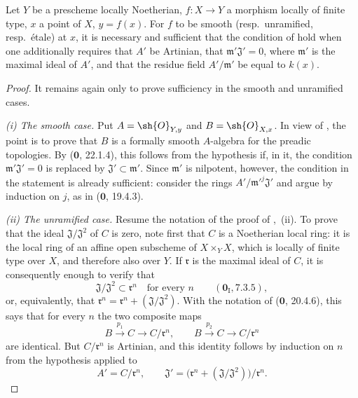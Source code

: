\begin{proposition}[17.14.2]
\label{IV.17.14.2}
Let $Y$ be a prescheme locally Noetherian, $f:X\to Y$ a morphism locally of finite type, $x$ a point of $X$, $y=f(x)$.
For $f$ to be smooth (resp.\ unramified, resp.\ \'etale) at $x$, it is necessary and sufficient that the condition of  hold when one additionally requires that $A'$ be Artinian, that $\mathfrak m'\mathfrak J'=0$, where $\mathfrak m'$ is the maximal ideal of $A'$, and that the residue field $A'/\mathfrak m'$ be equal to $k(x)$.
\end{proposition}


\begin{proof}
It remains again only to prove sufficiency in the smooth and unramified cases.

\emph{(i) The smooth case.}
Put $A=\sh{O}_{Y,y}$ and $B=\sh{O}_{X,x}$.  In view of , the point is to prove that $B$ is a formally smooth $A$-algebra for the preadic topologies.  By ($\mathbf{0}$, 22.1.4), this follows from the hypothesis if, in it, the condition $\mathfrak m'\mathfrak J'=0$ is replaced by $\mathfrak J'\subset\mathfrak m'$.  Since $\mathfrak m'$ is nilpotent, however, the condition in the statement is already sufficient: consider the rings $A'/\mathfrak m'^j\mathfrak J'$ and argue by induction on $j$, as in ($\mathbf{0}$, 19.4.3).

\emph{(ii) The unramified case.}
Resume the notation of the proof of ,~(ii).  To prove that the ideal $\mathfrak J/\mathfrak J^2$ of $C$ is zero, note first that $C$ is a Noetherian local ring: it is the local ring of an affine open subscheme of $X\times_YX$, which is locally of finite type over $X$, and therefore also over $Y$.  If $\mathfrak r$ is the maximal ideal of $C$, it is consequently enough to verify that
\[
 \mathfrak J/\mathfrak J^2\subset\mathfrak r^n
 \quad\text{for every }n
 \qquad(\mathbf{0}_{\mathrm I}, 7.3.5),
\]
or, equivalently, that $\mathfrak r^n=\mathfrak r^n+(\mathfrak J/\mathfrak J^2)$.  With the notation of ($\mathbf{0}$, 20.4.6), this says that for every $n$ the two composite maps
\[
 B\xrightarrow{p_1}C\longrightarrow C/\mathfrak r^n,
 \qquad
 B\xrightarrow{p_2}C\longrightarrow C/\mathfrak r^n
\]
are identical.  But $C/\mathfrak r^n$ is Artinian, and this identity follows by induction on $n$ from the hypothesis applied to
\[
 A'=C/\mathfrak r^n,
 \qquad
 \mathfrak J'=\bigl(\mathfrak r^n+(\mathfrak J/\mathfrak J^2)\bigr)/\mathfrak r^n.
\]
\end{proof}

